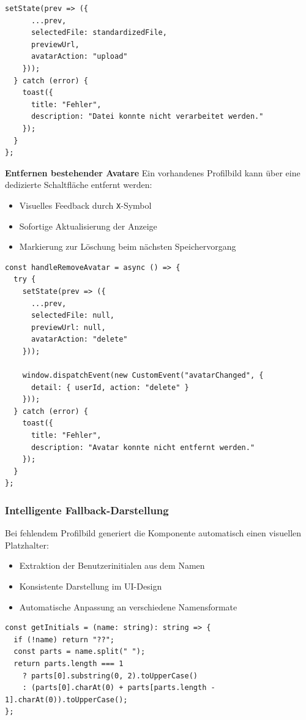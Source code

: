 \begin{inhalt}
\begin{lstlisting}[style=mytsx, caption={Implementierung des Avatar-Uploads mit Validierung}, label={lst:avatar_upload}]
    setState(prev => ({
      ...prev,
      selectedFile: standardizedFile,
      previewUrl,
      avatarAction: "upload"
    }));
  } catch (error) {
    toast({
      title: "Fehler",
      description: "Datei konnte nicht verarbeitet werden."
    });
  }
};
\end{lstlisting}

\textbf{Entfernen bestehender Avatare}
\vspace{0.15cm}
Ein vorhandenes Profilbild kann über eine dedizierte Schaltfläche entfernt werden:
\begin{itemize}
    \item Visuelles Feedback durch \texttt{X}-Symbol
    \item Sofortige Aktualisierung der Anzeige
    \item Markierung zur Löschung beim nächsten Speichervorgang
\end{itemize}

\begin{lstlisting}[style=mytsx, caption={Implementierung der Avatar-Löschung}, label={lst:avatar_delete}]
const handleRemoveAvatar = async () => {
  try {
    setState(prev => ({
      ...prev,
      selectedFile: null,
      previewUrl: null,
      avatarAction: "delete"
    }));
    
    window.dispatchEvent(new CustomEvent("avatarChanged", {
      detail: { userId, action: "delete" }
    }));
  } catch (error) {
    toast({
      title: "Fehler",
      description: "Avatar konnte nicht entfernt werden."
    });
  }
};
\end{lstlisting}

\subsubsection{Intelligente Fallback-Darstellung}
Bei fehlendem Profilbild generiert die Komponente automatisch einen visuellen Platzhalter:
\begin{itemize}
    \item Extraktion der Benutzerinitialen aus dem Namen
    \item Konsistente Darstellung im UI-Design
    \item Automatische Anpassung an verschiedene Namensformate
\end{itemize}

\begin{lstlisting}[style=mytsx, caption={Generierung der Fallback-Initialen}, label={lst:avatar_initials}]
const getInitials = (name: string): string => {
  if (!name) return "??";
  const parts = name.split(" ");
  return parts.length === 1
    ? parts[0].substring(0, 2).toUpperCase()
    : (parts[0].charAt(0) + parts[parts.length - 1].charAt(0)).toUpperCase();
};
\end{lstlisting}


\end{inhalt}
